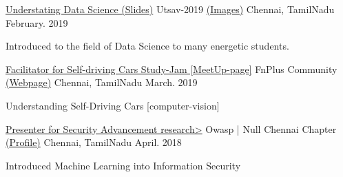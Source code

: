 

\begin{cventries}


  \cventry
    {\href{https://drive.google.com/file/d/1lLDBsU1gFQ10r5X5_tnFzOceWMK0CriR/view?usp=sharing}{Understating Data Science (Slides)}} %
    {Utsav-2019 \href{https://photos.app.goo.gl/3ZDVgiYmo56ZnNbQ6}{(Images)}} %
    {Chennai, TamilNadu} %
    {February. 2019} %
    {
      \begin{cvitems} %
        \item {Introduced to the field of Data Science to many energetic students. }
      \end{cvitems}
    }


  \cventry
    {\href{https://www.meetup.com/geek-meetup-chennai/events/259322931/}{Facilitator for Self-driving Cars Study-Jam [MeetUp-page]}} %
    {FnPlus Community \href{https://www.fnplus.tech/}{(Webpage)}} %
    {Chennai, TamilNadu} %
    {March. 2019} %
    {
      \begin{cvitems} %
        \item {Understanding Self-Driving Cars [computer-vision]}
      \end{cvitems}
    }

  \cventry
    {\href{https://null.co.in/profile/11346-teja-kummarikuntla}{Presenter for Security Advancement research>}} %
    {Owasp | Null Chennai Chapter \href{https://null.co.in/profile/11346-teja-kummarikuntla}{(Profile)}} %
    {Chennai, TamilNadu} %
    {April. 2018} %
    {
      \begin{cvitems} %
        \item {Introduced Machine Learning into Information Security}
      \end{cvitems}
    }

\end{cventries}
